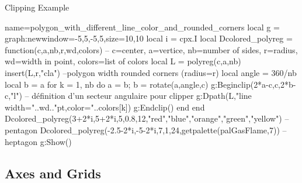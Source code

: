 \begin{demo}{Clipping Example}
\begin{luadraw}{name=polygon_with_different_line_color_and_rounded_corners}
local g = graph:new{window={-5,5,-5,5},size={10,10}}
local i = cpx.I
local Dcolored_polyreg = function(c,a,nb,r,wd,colors) 
-- c=center, a=vertice, nb=number of sides, r=radius, wd=width in point, colors=list of colors
    local L = polyreg(c,a,nb)
    insert(L,{r,"cla"}) --polygon width rounded corners (radius=r)
    local angle = 360/nb
    local b = a
    for k = 1, nb do
        a = b; b = rotate(a,angle,c)
        g:Beginclip({2*a-c,c,2*b-c,"l"})  -- définition d'un secteur angulaire pour clipper
        g:Dpath(L,"line width="..wd.."pt,color="..colors[k])
        g:Endclip()
    end
end
Dcolored_polyreg(3+2*i,5+2*i,5,0.8,12,{"red","blue","orange","green","yellow"}) -- pentagon
Dcolored_polyreg(-2.5-2*i,-5-2*i,7,1,24,getpalette(palGasFlame,7))  -- heptagon
g:Show()
\end{luadraw}
\end{demo}


\subsection{Axes and Grids}


